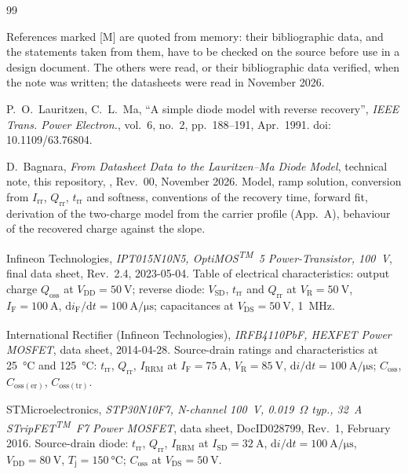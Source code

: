 \documentclass[10pt,a4paper]{scrartcl}
\newcommand{\Irr}{I_\mathrm{rr}}
\newcommand{\Qrr}{Q_\mathrm{rr}}
\newcommand{\trr}{t_\mathrm{rr}}
\newcommand{\diff}{\mathrm{d}}
\begin{document}
\begin{thebibliography}{99}
\small
\item[] References marked [M] are quoted from memory: their bibliographic data, and the statements taken from them, have to be checked on the source before use in a design document. The others were read, or their bibliographic data verified, when the note was written; the datasheets were read in November 2026.

P.~O.~Lauritzen, C.~L.~Ma, ``A simple diode model with reverse recovery'', \emph{IEEE Trans. Power Electron.}, vol.~6, no.~2, pp.~188--191, Apr.~1991. doi:\,10.1109/63.76804.

D.~Bagnara, \emph{From Datasheet Data to the Lauritzen--Ma Diode Model}, technical note, this repository, , Rev.~00, November 2026. Model, ramp solution, conversion from $\Irr$, $\Qrr$, $\trr$ and softness, conventions of the recovery time, forward fit, derivation of the two-charge model from the carrier profile (App.~A), behaviour of the recovered charge against the slope.

Infineon Technologies, \emph{IPT015N10N5, OptiMOS\textsuperscript{TM}~5 Power-Transistor, 100~V}, final data sheet, Rev.~2.4, 2023-05-04. Table of electrical characteristics: output charge $Q_\mathrm{oss}$ at $V_\mathrm{DD} = \SI{50}{\volt}$; reverse diode: $V_\mathrm{SD}$, $t_\mathrm{rr}$ and $Q_\mathrm{rr}$ at $V_\mathrm{R} = \SI{50}{\volt}$, $I_\mathrm{F} = \SI{100}{\ampere}$, $\diff i_\mathrm{F}/\diff t = \SI{100}{\ampere\per\micro\second}$; capacitances at $V_\mathrm{DS} = \SI{50}{\volt}$, \SI{1}{\mega\hertz}.

International Rectifier (Infineon Technologies), \emph{IRFB4110PbF, HEXFET\textsuperscript{\textregistered} Power MOSFET}, data sheet, 2014-04-28. Source-drain ratings and characteristics at \SI{25}{\celsius} and \SI{125}{\celsius}: $t_\mathrm{rr}$, $Q_\mathrm{rr}$, $I_\mathrm{RRM}$ at $I_\mathrm{F} = \SI{75}{\ampere}$, $V_\mathrm{R} = \SI{85}{\volt}$, $\diff i/\diff t = \SI{100}{\ampere\per\micro\second}$; $C_\mathrm{oss}$, $C_\mathrm{oss(er)}$, $C_\mathrm{oss(tr)}$.

STMicroelectronics, \emph{STP30N10F7, N-channel 100~V, 0.019~$\Omega$ typ., 32~A STripFET\textsuperscript{TM}~F7 Power MOSFET}, data sheet, DocID028799, Rev.~1, February 2016. Source-drain diode: $t_\mathrm{rr}$, $Q_\mathrm{rr}$, $I_\mathrm{RRM}$ at $I_\mathrm{SD} = \SI{32}{\ampere}$, $\diff i/\diff t = \SI{100}{\ampere\per\micro\second}$, $V_\mathrm{DD} = \SI{80}{\volt}$, $T_\mathrm{j} = \SI{150}{\celsius}$; $C_\mathrm{oss}$ at $V_\mathrm{DS} = \SI{50}{\volt}$.


\end{thebibliography}
\end{document}
